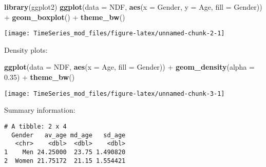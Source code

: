 \documentclass[]{article}
\newenvironment{Shaded}{\begin{snugshade}}{\end{snugshade}}
\newcommand{\KeywordTok}[1]{\textcolor[rgb]{0.13,0.29,0.53}{\textbf{{#1}}}}
\newcommand{\DataTypeTok}[1]{\textcolor[rgb]{0.13,0.29,0.53}{{#1}}}
\newcommand{\FloatTok}[1]{\textcolor[rgb]{0.00,0.00,0.81}{{#1}}}
\newcommand{\StringTok}[1]{\textcolor[rgb]{0.31,0.60,0.02}{{#1}}}
\newcommand{\NormalTok}[1]{{#1}}
\begin{document}
\begin{Shaded}
\begin{Highlighting}[]
\KeywordTok{library}\NormalTok{(ggplot2)}
\KeywordTok{ggplot}\NormalTok{(}\DataTypeTok{data =} \NormalTok{NDF, }\KeywordTok{aes}\NormalTok{(}\DataTypeTok{x =} \NormalTok{Gender, }\DataTypeTok{y =} \NormalTok{Age, }\DataTypeTok{fill =} \NormalTok{Gender)) +}\StringTok{ }\KeywordTok{geom_boxplot}\NormalTok{() +}\StringTok{ }
\StringTok{  }\KeywordTok{theme_bw}\NormalTok{()}
\end{Highlighting}
\end{Shaded}

\begin{center}\texttt{[image: TimeSeries\_mod\_files/figure-latex/unnamed-chunk-2-1]} \end{center}

Density plots:

\begin{Shaded}
\begin{Highlighting}[]
\KeywordTok{ggplot}\NormalTok{(}\DataTypeTok{data =} \NormalTok{NDF, }\KeywordTok{aes}\NormalTok{(}\DataTypeTok{x =} \NormalTok{Age, }\DataTypeTok{fill =} \NormalTok{Gender)) +}\StringTok{ }
\StringTok{  }\KeywordTok{geom_density}\NormalTok{(}\DataTypeTok{alpha =} \FloatTok{0.35}\NormalTok{) +}\StringTok{ }
\StringTok{  }\KeywordTok{theme_bw}\NormalTok{()}
\end{Highlighting}
\end{Shaded}

\begin{center}\texttt{[image: TimeSeries\_mod\_files/figure-latex/unnamed-chunk-3-1]} \end{center}

Summary information:

\begin{Shaded}
\end{Shaded}

\begin{verbatim}
# A tibble: 2 x 4
  Gender   av_age md_age   sd_age
   <chr>    <dbl>  <dbl>    <dbl>
1    Men 24.25000  23.75 1.490820
2  Women 21.75172  21.15 1.554421
\end{verbatim}
\end{document}
